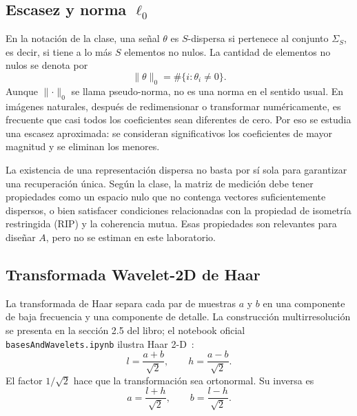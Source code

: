 \documentclass[11pt,a4paper]{article}
\begin{document}
\subsection{Escasez y norma \texorpdfstring{$\ell_0$}{l0}}

En la notación de la clase, una señal $\theta$ es $S$-dispersa si pertenece al conjunto $\Sigma_S$, es decir, si tiene a lo más $S$ elementos no nulos. La cantidad de elementos no nulos se denota por~\cite{lecture}
\begin{equation}
    \lVert\theta\rVert_0=\#\{i:\theta_i\neq0\}.
    \label{eq:l0}
\end{equation}
Aunque $\lVert\cdot\rVert_0$ se llama pseudo-norma, no es una norma en el sentido usual. En imágenes naturales, después de redimensionar o transformar numéricamente, es frecuente que casi todos los coeficientes sean diferentes de cero. Por eso se estudia una escasez aproximada: se consideran significativos los coeficientes de mayor magnitud y se eliminan los menores.

La existencia de una representación dispersa no basta por sí sola para garantizar una recuperación única. Según la clase, la matriz de medición debe tener propiedades como un espacio nulo que no contenga vectores suficientemente dispersos, o bien satisfacer condiciones relacionadas con la propiedad de isometría restringida (RIP) y la coherencia mutua. Esas propiedades son relevantes para diseñar $A$, pero no se estiman en este laboratorio.

\subsection{Transformada Wavelet-2D de Haar}

La transformada de Haar separa cada par de muestras $a$ y $b$ en una componente de baja frecuencia y una componente de detalle. La construcción multirresolución se presenta en la sección 2.5 del libro; el notebook oficial \texttt{basesAndWavelets.ipynb} ilustra Haar 2-D~\cite{book,waveletNotebook,wavelet}:
\begin{equation}
    l=\frac{a+b}{\sqrt{2}},
    \qquad
    h=\frac{a-b}{\sqrt{2}}.
    \label{eq:haar1d}
\end{equation}
El factor $1/\sqrt{2}$ hace que la transformación sea ortonormal. Su inversa es
\begin{equation}
    a=\frac{l+h}{\sqrt{2}},
    \qquad
    b=\frac{l-h}{\sqrt{2}}.
    \label{eq:haar-inv}
\end{equation}
\end{document}
